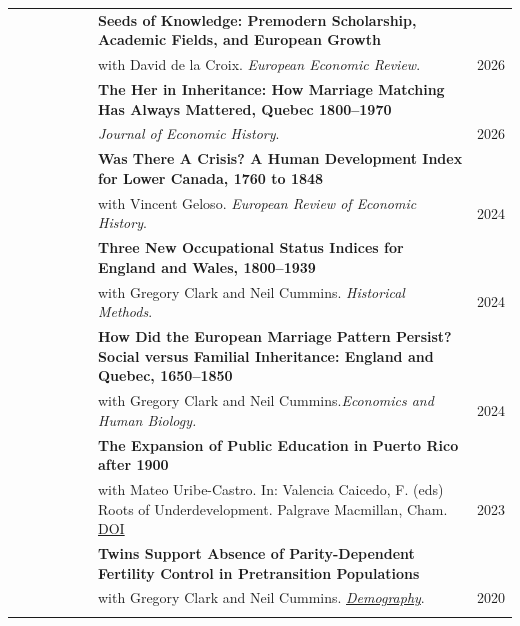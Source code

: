 \documentclass[a4paper,11pt,oneside]{article}
\begin{document}
\begin{longtable}{@{} p{0.175\linewidth} p{0.775\linewidth} p{0.05\linewidth}}
   & \textbf{Seeds of Knowledge: Premodern Scholarship, Academic Fields, and European Growth }\\ 
   &   with David de la Croix. \emph{European Economic Review}. & 2026 \\
   

   & \textbf{The Her in Inheritance: How Marriage Matching Has Always Mattered, Quebec 1800--1970}\\ 
   &  \emph{Journal of Economic History}. &  \hfill 2026  \\


   &  \textbf{Was There A Crisis? A Human Development Index for Lower Canada, 1760 to 1848 } \\ 
   &   with Vincent Geloso.  \emph{European Review of Economic History}.  &  2024 \\


   & \textbf{Three New Occupational Status Indices for England and Wales, 1800--1939}\\ 
   &  with Gregory Clark and Neil Cummins. \emph{Historical Methods}. & \hfill 2024  \\

  
   & \textbf{How Did the European Marriage Pattern Persist? Social versus Familial Inheritance: England and Quebec, 1650--1850 }\\ 
   &   with Gregory Clark and Neil Cummins.\emph{Economics and Human Biology.}  & \hfill 2024 \\


   & \textbf{The Expansion of Public Education in Puerto Rico after 1900} \\
   & with Mateo Uribe-Castro. In: Valencia Caicedo, F. (eds) Roots of Underdevelopment. Palgrave Macmillan, Cham. \href{https://doi.org/10.1007/978-3-031-38723-4_19}{DOI}& \hfill 2023\\

    & \textbf{Twins Support Absence of Parity-Dependent Fertility Control in Pretransition Populations }\\
   &  with Gregory Clark and Neil Cummins. \href{https://read.dukeupress.edu/demography/article/57/4/1571/168109/Twins-Support-the-Absence-of-Parity-Dependent}{\emph{Demography}}. & \hfill 2020\\

 \\
  
  


\end{longtable}
\end{document}
